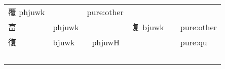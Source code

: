 \documentclass[14pt,a4paper]{scrartcl}
\begin{document}
\begin{longtable}[c]{@{}llllll@{}}
\begin{minipage}[t]{0.14\columnwidth}\raggedright\strut
覆 phjuwk
\strut\end{minipage} &
\begin{minipage}[t]{0.14\columnwidth}\raggedright\strut
\strut\end{minipage} &
\begin{minipage}[t]{0.14\columnwidth}\raggedright\strut
pure:other
\strut\end{minipage}\tabularnewline
\begin{minipage}[t]{0.14\columnwidth}\raggedright\strut
畗
\strut\end{minipage} &
\begin{minipage}[t]{0.14\columnwidth}\raggedright\strut
phjuwk
\strut\end{minipage} &
\begin{minipage}[t]{0.14\columnwidth}\raggedright\strut
\strut\end{minipage} &
\begin{minipage}[t]{0.14\columnwidth}\raggedright\strut
复 bjuwk
\strut\end{minipage} &
\begin{minipage}[t]{0.14\columnwidth}\raggedright\strut
\strut\end{minipage} &
\begin{minipage}[t]{0.14\columnwidth}\raggedright\strut
pure:other
\strut\end{minipage}\tabularnewline
\begin{minipage}[t]{0.14\columnwidth}\raggedright\strut
復
\strut\end{minipage} &
\begin{minipage}[t]{0.14\columnwidth}\raggedright\strut
bjuwk
\strut\end{minipage} &
\begin{minipage}[t]{0.14\columnwidth}\raggedright\strut
𥨍 phjuwH
\strut\end{minipage} &
\begin{minipage}[t]{0.14\columnwidth}\raggedright\strut
\strut\end{minipage} &
\begin{minipage}[t]{0.14\columnwidth}\raggedright\strut
\strut\end{minipage} &
\begin{minipage}[t]{0.14\columnwidth}\raggedright\strut
pure:qu
\strut\end{minipage}\tabularnewline
\begin{minipage}[t]{0.14\columnwidth}\raggedright\strut
𡕨

\end{minipage}
\end{longtable}
\end{document}
